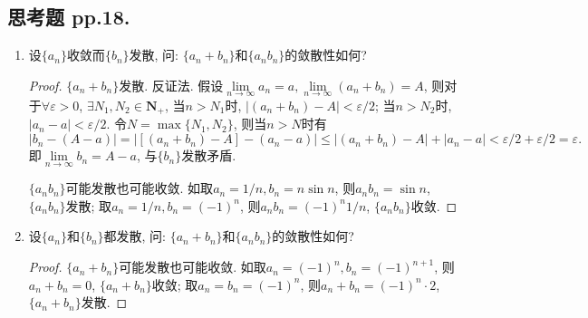 \documentclass[a4paper,11pt,twoside]{ctexbook}
\begin{document}
\subsection{思考题 pp.18.}
\begin{enumerate}
	\item	设$\{a_n\}$收敛而$\{b_n\}$发散, 问: $\{a_n+b_n\}$和$\{a_nb_n\}$的敛散性如何?
	      \begin{proof}
		      $\{a_n+b_n\}$发散. 反证法. 假设$\lim\limits_{n\to\infty} a_n=a, \lim\limits_{n\to\infty} (a_n+b_n)=A$, 则对于$\forall\varepsilon>0$, $\exists N_1, N_2\in\mathbf{N}_{+}$, 当$n>N_1$时, $|(a_n+b_n)-A|<\varepsilon/2$; 当$n>N_2$时, $|a_n-a|<\varepsilon/2$. 令$N=\max\{N_1,N_2\}$, 则当$n>N$时有
		      \[
			      |b_n-(A-a)|=|[(a_n+b_n)-A]-(a_n-a)|\leqslant|(a_n+b_n)-A|+|a_n-a|<\varepsilon/2+\varepsilon/2=\varepsilon.
		      \]
		      即$\lim\limits_{n\to\infty} b_n=A-a$, 与$\{b_n\}$发散矛盾.

		      $\{a_nb_n\}$可能发散也可能收敛. 如取$a_n=1/n, b_n=n\sin{n}$, 则$a_nb_n=\sin{n}$, $\{a_nb_n\}$发散; 取$a_n=1/n, b_n=(-1)^n$, 则$a_nb_n=(-1)^n 1/n$, $\{a_nb_n\}$收敛.\qedhere
	      \end{proof}
	\item 设$\{a_n\}$和$\{b_n\}$都发散, 问: $\{a_n+b_n\}$和$\{a_nb_n\}$的敛散性如何?
	      \begin{proof}
		      $\{a_n+b_n\}$可能发散也可能收敛. 如取$a_n=(-1)^n, b_n=(-1)^{n+1}$, 则$a_n+b_n=0$, $\{a_n+b_n\}$收敛; 取$a_n=b_n=(-1)^n$, 则$a_n+b_n=(-1)^n\cdot 2$, $\{a_n+b_n\}$发散.


\end{proof}
\end{enumerate}
\end{document}
